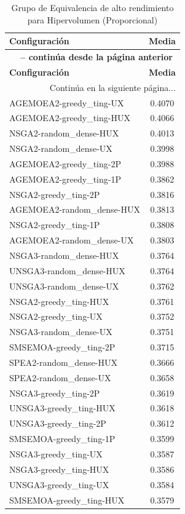 \begin{longtable}{lc}
    \caption{Grupo de Equivalencia de alto rendimiento para Hipervolumen (Proporcional)}
    \label{tab:elite_hv_prop} \\
    \toprule
    \textbf{Configuración} & \textbf{Media} \\
    \midrule
    \endfirsthead
    \multicolumn{2}{c}{{\bfseries \tablename\ \thetable{} -- continúa desde la página anterior}} \\
    \toprule
    \textbf{Configuración} & \textbf{Media} \\
    \midrule
    \endhead
    \midrule \multicolumn{2}{r}{{Continúa en la siguiente página...}} \\
    \endfoot
    \bottomrule
    \endlastfoot
    AGEMOEA2-greedy\_ting-UX & 0.4070 \\
AGEMOEA2-greedy\_ting-HUX & 0.4066 \\
NSGA2-random\_dense-HUX & 0.4013 \\
NSGA2-random\_dense-UX & 0.3998 \\
AGEMOEA2-greedy\_ting-2P & 0.3988 \\
AGEMOEA2-greedy\_ting-1P & 0.3862 \\
NSGA2-greedy\_ting-2P & 0.3816 \\
AGEMOEA2-random\_dense-HUX & 0.3813 \\
NSGA2-greedy\_ting-1P & 0.3808 \\
AGEMOEA2-random\_dense-UX & 0.3803 \\
NSGA3-random\_dense-HUX & 0.3764 \\
UNSGA3-random\_dense-HUX & 0.3764 \\
UNSGA3-random\_dense-UX & 0.3762 \\
NSGA2-greedy\_ting-HUX & 0.3761 \\
NSGA2-greedy\_ting-UX & 0.3752 \\
NSGA3-random\_dense-UX & 0.3751 \\
SMSEMOA-greedy\_ting-2P & 0.3715 \\
SPEA2-random\_dense-HUX & 0.3666 \\
SPEA2-random\_dense-UX & 0.3658 \\
NSGA3-greedy\_ting-2P & 0.3619 \\
UNSGA3-greedy\_ting-HUX & 0.3618 \\
UNSGA3-greedy\_ting-2P & 0.3612 \\
SMSEMOA-greedy\_ting-1P & 0.3599 \\
NSGA3-greedy\_ting-UX & 0.3587 \\
NSGA3-greedy\_ting-HUX & 0.3586 \\
UNSGA3-greedy\_ting-UX & 0.3584 \\
SMSEMOA-greedy\_ting-HUX & 0.3579 \\
\end{longtable}

